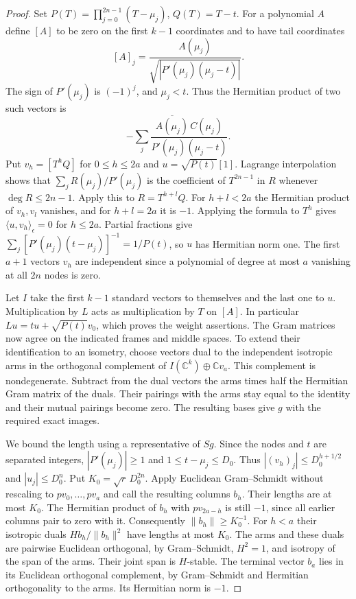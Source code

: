 \documentclass[a4paper,11pt]{article}
\theoremstyle{definition}
\theoremstyle{remark}
\numberwithin{equation}{section}
\begin{document}
\begin{proof}
Set \(P(T)=\prod_{j=0}^{2n-1}(T-\mu_j)\), \(Q(T)=T-t\).
For a polynomial \(A\) define \([A]\) to be zero on the first
\(k-1\) coordinates and to have tail coordinates
\[
             [A]_j=\frac{A(\mu_j)}
                 {\sqrt{|P'(\mu_j)(\mu_j-t)|}} .
\]
The sign of \(P'(\mu_j)\) is \((-1)^j\), and \(\mu_j<t\).
Thus the Hermitian product of two such vectors is
\[
 -\sum_j\frac{\overline{A(\mu_j)}\,C(\mu_j)}
                   {P'(\mu_j)(\mu_j-t)} .
\]
Put \(v_h=[T^hQ]\) for \(0\le h\le 2a\) and
\(u=\sqrt{P(t)}[1]\). Lagrange interpolation shows that
\(\sum_j R(\mu_j)/P'(\mu_j)\) is the coefficient of
\(T^{2n-1}\) in \(R\) whenever \(\deg R\le 2n-1\).
Apply this to \(R=T^{h+l}Q\). For \(h+l<2a\) the Hermitian
product of \(v_h,v_l\) vanishes, and for \(h+l=2a\) it is
\(-1\). Applying the formula to \(T^h\) gives
\(\langle u,v_h\rangle_{\epsilon}=0\) for \(h\le2a\).
Partial fractions give
\(\sum_j [P'(\mu_j)(t-\mu_j)]^{-1}=1/P(t)\), so \(u\)
has Hermitian norm one. The first \(a+1\) vectors \(v_h\)
are independent since a polynomial of degree at most \(a\)
vanishing at all \(2n\) nodes is zero.

Let \(I\) take the first \(k-1\) standard vectors to themselves
and the last one to \(u\). Multiplication by \(L\) acts as
multiplication by \(T\) on \([A]\). In particular
\(Lu=tu+\sqrt{P(t)}v_0\), which proves the weight assertions.
The Gram matrices now agree on the indicated frames and middle
spaces. To extend their identification to an isometry, choose
vectors dual to the independent isotropic arms in the
orthogonal complement of \(I(\mathbb C^k)\oplus\mathbb Cv_a\).
This complement is nondegenerate. Subtract from the dual
vectors the arms times half the Hermitian Gram matrix of the
duals. Their pairings with the arms stay equal to the identity
and their mutual pairings become zero. The resulting bases
give \(g\) with the required exact images.

We bound the length using a representative of \(Sg\). Since
the nodes and \(t\) are separated integers, \(|P'(\mu_j)|\ge1\)
and \(1\le t-\mu_j\le D_0\). Thus
\(|(v_h)_j|\le D_0^{h+1/2}\) and \(|u_j|\le D_0^n\).
Put \(K_0=\sqrt r\, D_0^{2n}\). Apply Euclidean Gram--Schmidt
without rescaling to \(p v_0,\ldots,p v_a\) and call the
resulting columns \(b_h\). Their lengths are at most \(K_0\).
The Hermitian product of \(b_h\) with \(p v_{2a-h}\) is still
\(-1\), since all earlier columns pair to zero with it.
Consequently \(\|b_h\|\ge K_0^{-1}\). For \(h<a\) their
isotropic duals \(H b_h/\|b_h\|^2\) have lengths at most
\(K_0\). The arms and these duals are pairwise Euclidean
orthogonal, by Gram--Schmidt, \(H^2=1\), and isotropy of the
span of the arms. Their joint span is \(H\)-stable. The
terminal vector \(b_a\) lies in its Euclidean orthogonal
complement, by Gram--Schmidt and Hermitian orthogonality
to the arms. Its Hermitian norm is \(-1\).


\end{proof}
\end{document}
